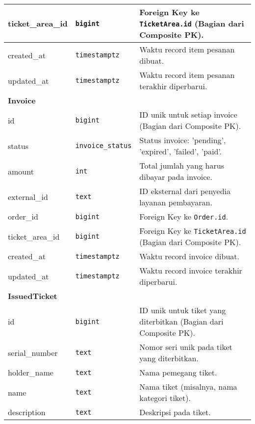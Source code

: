 \begin{longtable}{|l|p{}|p{}|}
	\hline
	ticket\_area\_id 	& \texttt{bigint} 		& Foreign Key ke \texttt{TicketArea.id} (Bagian dari Composite PK). 																		\\
	\hline
	created\_at 		& \texttt{timestamptz} 	& Waktu record item pesanan dibuat. 																													\\
	\hline
	updated\_at 		& \texttt{timestamptz} 	& Waktu record item pesanan terakhir diperbarui. 																								\\
	\hline
	\multicolumn{3}{|l|}{\textbf{Invoice}} \\
	\hline
	id 					& \texttt{bigint} 		& ID unik untuk setiap invoice (Bagian dari Composite PK). 																				\\
	\hline
	status 				& \texttt{invoice\_status} & Status invoice: 'pending', 'expired', 'failed', 'paid'. 																				\\
	\hline
	amount 				& \texttt{int} 			& Total jumlah yang harus dibayar pada invoice. 																										\\
	\hline
	external\_id 		& \texttt{text} 			& ID eksternal dari penyedia layanan pembayaran. 																							\\
	\hline
	order\_id 			& \texttt{bigint} 		& Foreign Key ke \texttt{Order.id}. 																													\\
	\hline
	ticket\_area\_id 	& \texttt{bigint} 		& Foreign Key ke \texttt{TicketArea.id} (Bagian dari Composite PK). 																		\\
	\hline
	created\_at 		& \texttt{timestamptz} 	& Waktu record invoice dibuat. 																														\\
	\hline
	updated\_at 		& \texttt{timestamptz} 	& Waktu record invoice terakhir diperbarui. 																										\\
	\hline
	\multicolumn{3}{|l|}{\textbf{IssuedTicket}} \\
	\hline
	id 					& \texttt{bigint} 		& ID unik untuk tiket yang diterbitkan (Bagian dari Composite PK). 																			\\
	\hline
	serial\_number 		& \texttt{text} 			& Nomor seri unik pada tiket yang diterbitkan. 																										\\
	\hline
	holder\_name 		& \texttt{text} 			& Nama pemegang tiket. 																																\\
	\hline
	name 				& \texttt{text} 			& Nama tiket (misalnya, nama kategori tiket). 																										\\
	\hline
	description 		& \texttt{text} 			& Deskripsi pada tiket. 																															\\

\end{longtable}
